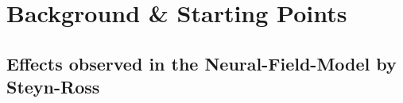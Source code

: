 
\chapter{Background \& Starting Points}\label{ch:theoretical-concepts} %

%

\pagebreak

\pagebreak

\pagebreak
%
\section{Effects observed in the Neural-Field-Model by Steyn-Ross}\label{sec:effects-observed-in-the-neural-field-model-by-steyn-ross}
